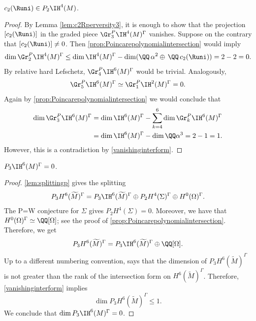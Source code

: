 \begin{lem}\label{lem:c2perversity}
$c_2(\Runi) \in P_2 \IH^4(M)$.
\end{lem}
\begin{proof}
By Lemma \ref{lem:c2Rperversity3}, it is enough to show that the projection $[c_2(\Runi)]$ in the graded piece $\Gr^P_3\IH^4(M)^{\Gamma}$ vanishes. Suppose on the contrary that $[c_2(\Runi)]\neq 0$.
Then \cref{prop:Poincarepolynomialintersection} would imply
\[
\dim \Gr^P_2 \IH^4(M)^{\Gamma}\leq \dim \IH^4(M)^{\Gamma} - \dim (\QQ \,\alpha^2 \oplus \,\QQ \,c_2(\Runi)) =2-2=0.
\]
By relative hard Lefschetz, $\Gr^P_4 \IH^6(M)^{\Gamma}$ would be trivial. Analogously,
\[
\Gr^P_5 \IH^6(M)^{\Gamma}\simeq \Gr^P_1 \IH^2(M)^{\Gamma}=0.
\]
Again by \cref{prop:Poincarepolynomialintersection} we would conclude that
\begin{align*}
\dim \Gr^P_3\IH^6(M)^{\Gamma} & = \dim \IH^6(M)^{\Gamma} - \sum^6_{k=4}\dim \Gr^P_k\IH^6(M)^{\Gamma} \\
& = \dim \IH^6(M)^{\Gamma} - \dim \QQ\alpha^3 = 2-1= 1.
\end{align*}
However, this is a contradiction by \cref{vanishinginterform}.
\end{proof}

\begin{lem}\label{lem:c2perversityII}
$P_3 \IH^6(M)^{\Gamma}=0$.
\end{lem}

\begin{proof}
\cref{lem:splittingp} gives the splitting
\[
P_3 H^6(\widetilde{M})^{\Gamma} = P_3 \IH^6(\widetilde{M})^{\Gamma} \oplus P_2 H^4(\Sigma)^{\Gamma} \oplus H^0(\Omega)^{\Gamma}.
\]
The P=W conjecture for $\Sigma$ gives $P_2 H^4(\Sigma)=0$.
Moreover, we have that
$H^0(\Omega)^{\Gamma} \simeq \QQ [\Omega]$; see the proof of \cref{prop:Poincarepolynomialintersection}. Therefore, we get
\[
P_3 H^6(\widetilde{M})^{\Gamma} = P_3 \IH^6(\widetilde{M})^{\Gamma} \oplus \QQ [\Omega].
\]
Up to a different numbering convention, \cite[Th.\,2.1.10]{deCataldoMigliorini05} says that the dimension of $P_3 H^6(\widetilde{M})^{\Gamma}$ is not greater than the rank of the intersection form on $H^6(\widetilde{M})^{\Gamma}$. Therefore, \cref{vanishinginterform} implies
\[
\dim P_3 H^6(\widetilde{M})^{\Gamma}\leq 1.
\]
We conclude that $\dim P_3 \IH^6(M)^{\Gamma}=0$.
\end{proof}

